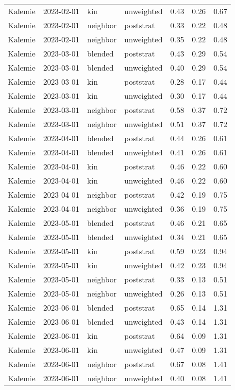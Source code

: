 \begin{table}[ht]
\begin{tabular}{llllrrr}
  Kalemie & 2023-02-01 & kin & unweighted & 0.43 & 0.26 & 0.67 \\ 
  Kalemie & 2023-02-01 & neighbor & poststrat & 0.33 & 0.22 & 0.48 \\ 
  Kalemie & 2023-02-01 & neighbor & unweighted & 0.35 & 0.22 & 0.48 \\ 
  Kalemie & 2023-03-01 & blended & poststrat & 0.43 & 0.29 & 0.54 \\ 
  Kalemie & 2023-03-01 & blended & unweighted & 0.40 & 0.29 & 0.54 \\ 
  Kalemie & 2023-03-01 & kin & poststrat & 0.28 & 0.17 & 0.44 \\ 
  Kalemie & 2023-03-01 & kin & unweighted & 0.30 & 0.17 & 0.44 \\ 
  Kalemie & 2023-03-01 & neighbor & poststrat & 0.58 & 0.37 & 0.72 \\ 
  Kalemie & 2023-03-01 & neighbor & unweighted & 0.51 & 0.37 & 0.72 \\ 
  Kalemie & 2023-04-01 & blended & poststrat & 0.44 & 0.26 & 0.61 \\ 
  Kalemie & 2023-04-01 & blended & unweighted & 0.41 & 0.26 & 0.61 \\ 
  Kalemie & 2023-04-01 & kin & poststrat & 0.46 & 0.22 & 0.60 \\ 
  Kalemie & 2023-04-01 & kin & unweighted & 0.46 & 0.22 & 0.60 \\ 
  Kalemie & 2023-04-01 & neighbor & poststrat & 0.42 & 0.19 & 0.75 \\ 
  Kalemie & 2023-04-01 & neighbor & unweighted & 0.36 & 0.19 & 0.75 \\ 
  Kalemie & 2023-05-01 & blended & poststrat & 0.46 & 0.21 & 0.65 \\ 
  Kalemie & 2023-05-01 & blended & unweighted & 0.34 & 0.21 & 0.65 \\ 
  Kalemie & 2023-05-01 & kin & poststrat & 0.59 & 0.23 & 0.94 \\ 
  Kalemie & 2023-05-01 & kin & unweighted & 0.42 & 0.23 & 0.94 \\ 
  Kalemie & 2023-05-01 & neighbor & poststrat & 0.33 & 0.13 & 0.51 \\ 
  Kalemie & 2023-05-01 & neighbor & unweighted & 0.26 & 0.13 & 0.51 \\ 
  Kalemie & 2023-06-01 & blended & poststrat & 0.65 & 0.14 & 1.31 \\ 
  Kalemie & 2023-06-01 & blended & unweighted & 0.43 & 0.14 & 1.31 \\ 
  Kalemie & 2023-06-01 & kin & poststrat & 0.64 & 0.09 & 1.31 \\ 
  Kalemie & 2023-06-01 & kin & unweighted & 0.47 & 0.09 & 1.31 \\ 
  Kalemie & 2023-06-01 & neighbor & poststrat & 0.67 & 0.08 & 1.41 \\ 
  Kalemie & 2023-06-01 & neighbor & unweighted & 0.40 & 0.08 & 1.41 \\ 
  \end{tabular}
\caption{} 
\label{table:preregister_monthly}
\end{table}

